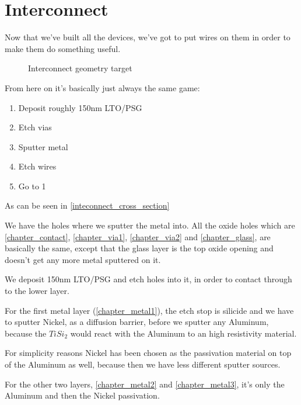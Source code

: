 \section{Interconnect}

Now that we've built all the devices, we've got to put wires on them in order to make them do something useful.

\begin{figure}[H]
	\centering
	\begin{tikzpicture}[node distance = 3cm, auto, thick,scale=\CrossSectionOnly, every node/.style={transform shape}]
		
	\end{tikzpicture}
	\caption{Interconnect geometry target}
	\label{inteconnect_cross_section}
\end{figure}

From here on it's basically just always the same game:
\begin{enumerate}
	\item Deposit roughly 150nm LTO/PSG
	\item Etch vias
	\item Sputter metal
	\item Etch wires
	\item Go to 1
\end{enumerate}

As can be seen in \autoref{inteconnect_cross_section}

We have the holes where we sputter the metal into.
All the oxide holes which are \autoref{chapter_contact}, \autoref{chapter_via1}, \autoref{chapter_via2} and \autoref{chapter_glass}, are basically the same,
except that the glass layer is the top oxide opening and doesn't get any more metal sputtered on it.

We deposit 150nm LTO/PSG and etch holes into it, in order to contact through to the lower layer.

For the first metal layer (\autoref{chapter_metal1}), the etch stop is silicide and we have to sputter Nickel, as a diffusion barrier, before we sputter any Aluminum,
because the $Ti Si_2$ would react with the Aluminum to an high resistivity material.

For simplicity reasons Nickel has been chosen as the passivation material on top of the Aluminum as well, because then we have less different sputter sources.

For the other two layers, \autoref{chapter_metal2} and \autoref{chapter_metal3}, it's only the Aluminum and then the Nickel passivation.

